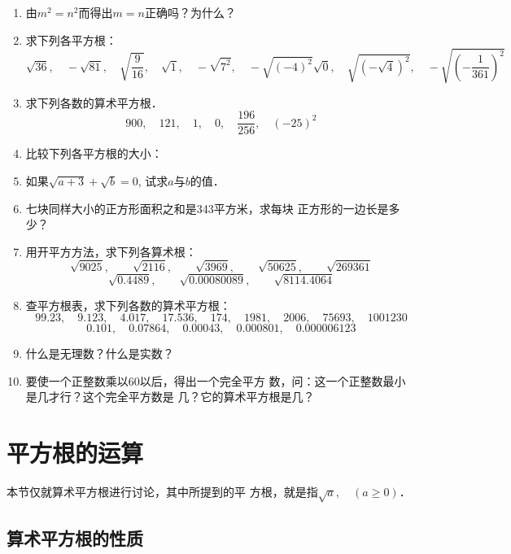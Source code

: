 \begin{enumerate}
\item 由$m^2=n^2$而得出$m=n$正确吗？为什么？
\item 求下列各平方根：
\[\sqrt{36},\quad -\sqrt{81},\quad \sqrt{\frac{9}{16}},\quad \sqrt{1},\quad -\sqrt{7^2},\quad -\sqrt{(-4)^2}
\sqrt{0},\quad \sqrt{(-\sqrt{4})^2},\quad -\sqrt{\left(-\frac{1}{361}\right)^2}\]
\item 求下列各数的算术平方根．
\[900,\quad 121,\quad 1,\quad 0,\quad \frac{196}{256},\quad (-25)^2\]

\item 比较下列各平方根的大小：
\begin{enumerate}
\end{enumerate}

\item 如果$\sqrt{a+3}+\sqrt{b}=0$, 试求$a$与$b$的值．
\item 七块同样大小的正方形面积之和是343平方米，求每块
正方形的一边长是多少？
\item 用开平方方法，求下列各算术根：
\[\sqrt{9025},\qquad \sqrt{2116},\qquad \sqrt{3969},\qquad \sqrt{50625},\qquad \sqrt{269361}\]
\[\sqrt{0.4489},\qquad \sqrt{0.00080089},\qquad \sqrt{8114.4064}\]
\item 查平方根表，求下列各数的算术平方根：
\[99.23,\quad 9.123,\quad 4.017,\quad 17.536,\quad 174,\quad 1981,\quad 2006,\quad 
75693,\quad 1001230\]
\[0.101,\quad 0.07864,\quad 0.00043,\quad 0.000801,\quad 
0.000006123\]
\item 什么是无理数？什么是实数？
\item 要使一个正整数乘以60以后，得出一个完全平方
数，问：这一个正整数最小是几才行？这个完全平方数是
几？它的算术平方根是几？
\end{enumerate}

\section{平方根的运算}
本节仅就算术平方根进行讨论，其中所提到的平
方根，就是指$\sqrt{a},\quad (a\ge 0)$．

\subsection{算术平方根的性质}

